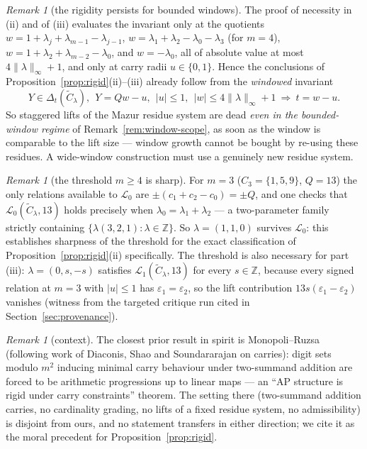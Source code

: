 \documentclass[11pt]{article}
\theoremstyle{definition}
\theoremstyle{remark}
\newtheorem{remark}[lemma]{Remark}
\newcommand{\Z}{\mathbb{Z}}
\newcommand{\loc}[1]{\mathcal{L}_{#1}}
\begin{document}
\begin{remark}[the rigidity persists for bounded
windows]\label{rem:windowed-rigidity}
The proof of necessity in (ii) and of (iii) evaluates the invariant only
at the quotients
$w=1+\lambda_j+\lambda_{m-1}-\lambda_{j-1}$,
$w=\lambda_1+\lambda_2-\lambda_0-\lambda_3$ (for $m=4$),
$w=1+\lambda_2+\lambda_{m-2}-\lambda_0$, and $w=-\lambda_0$, all of
absolute value at most $4\|\lambda\|_\infty+1$, and only at carry radii
$u\in\{0,1\}$. Hence the conclusions of
Proposition~\ref{prop:rigid}(ii)--(iii) already follow from the
\emph{windowed} invariant
\[
Y\in\Delta_t(\widetilde C_\lambda),\ \ Y=Qw-u,\ \ |u|\le1,\ \
|w|\le 4\|\lambda\|_\infty+1
\ \Longrightarrow\ t=w-u .
\]
So staggered lifts of the Mazur residue system are dead \emph{even in the
bounded-window regime} of Remark~\ref{rem:window-scope}, as soon as the
window is comparable to the lift size --- window growth cannot be bought
by re-using these residues. A wide-window construction must use a
genuinely new residue system.
\end{remark}

\begin{remark}[the threshold $m\ge4$ is sharp]\label{rem:m3}
For $m=3$ ($C_3=\{1,5,9\}$, $Q=13$) the only relations available to
$\loc0$ are $\pm(c_1+c_2-c_0)=\pm Q$, and one checks that
$\loc0(\widetilde C_\lambda,13)$ holds precisely when
$\lambda_0=\lambda_1+\lambda_2$ --- a two-parameter family strictly
containing $\{\lambda(3,2,1):\lambda\in\Z\}$. So $\lambda=(1,1,0)$
survives $\loc0$: this establishes sharpness of the threshold for the
exact classification of Proposition~\ref{prop:rigid}(ii) specifically.
The threshold is also necessary for part (iii): $\lambda=(0,s,-s)$
satisfies $\loc1(\widetilde C_\lambda,13)$ for every $s\in\Z$, because
every signed relation at $m=3$ with $|u|\le1$ has
$\varepsilon_1=\varepsilon_2$, so the lift contribution
$13s(\varepsilon_1-\varepsilon_2)$ vanishes (witness from the targeted
critique run cited in Section~\ref{sec:provenance}).
\end{remark}

\begin{remark}[context]\label{rem:mr}
The closest prior result in spirit is Monopoli--Ruzsa \cite{MR15}
(following work of Diaconis, Shao and Soundararajan on carries): digit
sets modulo $m^2$ inducing minimal carry behaviour under two-summand
addition are forced to be arithmetic progressions up to linear maps ---
an ``AP structure is rigid under carry constraints'' theorem. The setting
there (two-summand addition carries, no cardinality grading, no lifts of
a fixed residue system, no admissibility) is disjoint from ours, and no
statement transfers in either direction; we cite it as the moral
precedent for Proposition~\ref{prop:rigid}.
\end{remark}
\end{document}
